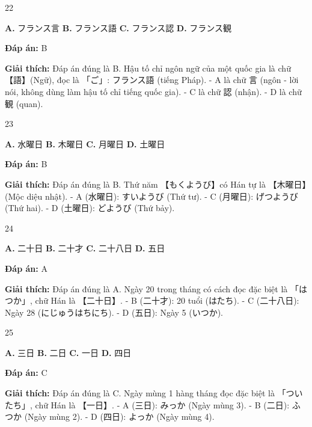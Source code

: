 \documentclass[12pt,a4paper]{report}
\newcommand{\source}[1]{}
\newcommand{\choice}[2]{\textbf{#1.} #2 \quad}
\newcommand{\answer}[1]{\par\textbf{Đáp án:} #1}
\newcommand{\confidence}[1]{}
\newcommand{\explain}[1]{\par\textbf{Giải thích:} #1\vspace{0.5cm}}
\begin{document}
\begin{question}{22}
\source{Q5.jpg}
\choice{A}{フランス言}
\choice{B}{フランス語}
\choice{C}{フランス認}
\choice{D}{フランス観}
\answer{B}
\confidence{high}
\explain{Đáp án đúng là B. Hậu tố chỉ ngôn ngữ của một quốc gia là chữ 【語】(Ngữ), đọc là 「ご」: フランス語 (tiếng Pháp).
- A là chữ 言 (ngôn - lời nói, không dùng làm hậu tố chỉ tiếng quốc gia).
- C là chữ 認 (nhận).
- D là chữ 観 (quan).}
\end{question}

\begin{question}{23}
\source{Q6.jpg}
\choice{A}{水曜日}
\choice{B}{木曜日}
\choice{C}{月曜日}
\choice{D}{土曜日}
\answer{B}
\confidence{high}
\explain{Đáp án đúng là B. Thứ năm 【もくようび】có Hán tự là 【木曜日】(Mộc diệu nhật).
- A (水曜日): すいようび (Thứ tư).
- C (月曜日): げつようび (Thứ hai).
- D (土曜日): どようび (Thứ bảy).}
\end{question}

\begin{question}{24}
\source{Q7.jpg}
\choice{A}{二十日}
\choice{B}{二十才}
\choice{C}{二十八日}
\choice{D}{五日}
\answer{A}
\confidence{high}
\explain{Đáp án đúng là A. Ngày 20 trong tháng có cách đọc đặc biệt là 「はつか」, chữ Hán là 【二十日】.
- B (二十才): 20 tuổi (はたち).
- C (二十八日): Ngày 28 (にじゅうはちにち).
- D (五日): Ngày 5 (いつか).}
\end{question}

\begin{question}{25}
\source{Q8.jpg}
\choice{A}{三日}
\choice{B}{二日}
\choice{C}{一日}
\choice{D}{四日}
\answer{C}
\confidence{high}
\explain{Đáp án đúng là C. Ngày mùng 1 hàng tháng đọc đặc biệt là 「ついたち」, chữ Hán là 【一日】.
- A (三日): みっか (Ngày mùng 3).
- B (二日): ふつか (Ngày mùng 2).
- D (四日): よっか (Ngày mùng 4).}
\end{question}
\end{document}
